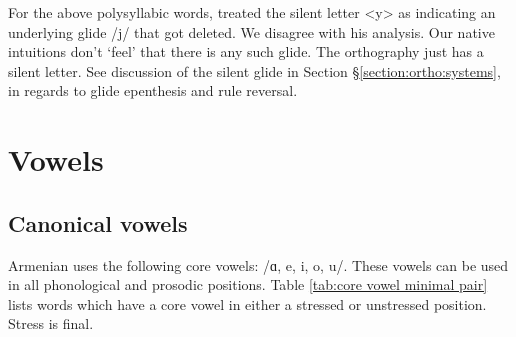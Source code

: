    
   For the above polysyllabic words, \citet[20]{Vaux-1998-ArmenianPhono} treated the silent letter  <y> as indicating an underlying glide /j/ that got deleted. We disagree with his analysis. Our native intuitions don't `feel' that there is any such glide. The orthography just has a silent letter. See discussion of the silent glide in Section \S\ref{section:ortho:systems}, in regards to glide epenthesis and rule reversal. 
   
   
   
   \section{Vowels}\label{section:segmentalPhono:vowel}
   
   \subsection{Canonical vowels}\label{section:segmentalPhono:vowel:canonical}
   Armenian uses the following core vowels: /ɑ, e, i, o, u/. These vowels can be used in all phonological and prosodic positions. Table \ref{tab:core vowel minimal pair} lists words which have a core vowel in either a stressed or unstressed position. Stress is final.
   
